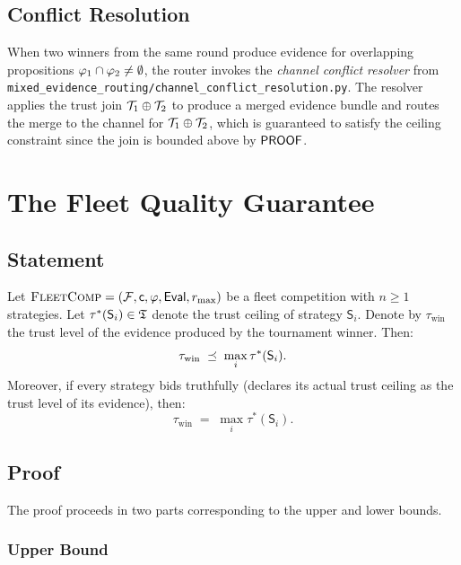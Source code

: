 \documentclass[11pt]{article}
\providecommand{\Fleet}{\mathcal{F}}              %
\providecommand{\Strat}{\mathsf{S}}               %
\providecommand{\Eval}{\mathsf{Eval}}             %
\providecommand{\FleetComp}{\textsc{FleetComp}}   %
\providecommand{\winner}{\mathrm{win}}            %
\begin{document}
\subsection{Conflict Resolution}

When two winners from the same round produce evidence for overlapping
propositions $\varphi_1 \cap \varphi_2 \neq \emptyset$, the router invokes the
\emph{channel conflict resolver} from
\texttt{mixed\_evidence\_routing/channel\_conflict\_resolution.py}.  The
resolver applies the trust join $\mathcal{T}_1 \oplus \mathcal{T}_2$ to produce a
merged evidence bundle and routes the merge to the channel for
$\mathcal{T}_1 \oplus \mathcal{T}_2$, which is guaranteed to satisfy the ceiling
constraint since the join is bounded above by $\mathsf{PROOF}$.

\section{The Fleet Quality Guarantee}\label{sec:theorem}

\subsection{Statement}

\begin{theorem}\label{thm:quality}
Let $\FleetComp = (\Fleet, \coord, \prop, \Eval, r_{\max})$ be a fleet
competition with $n \geq 1$ strategies.  Let $\tau^*(\Strat_i) \in \Talg$
denote the trust ceiling of strategy $\Strat_i$.  Denote by $\tau_{\winner}$
the trust level of the evidence produced by the tournament winner.  Then:
\[
  \tau_{\winner} \;\tleq\; \max_{i} \tau^*(\Strat_i).
\]
Moreover, if every strategy bids truthfully (declares its actual trust ceiling
as the trust level of its evidence), then:
\[
  \tau_{\winner} \;=\; \max_{i} \tau^*(\Strat_i).
\]
\end{theorem}

\subsection{Proof}

The proof proceeds in two parts corresponding to the upper and lower bounds.

\subsubsection{Upper Bound}
\end{document}
